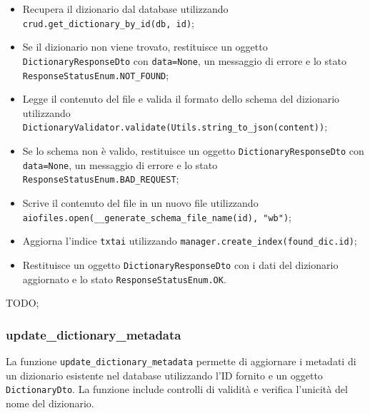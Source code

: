 \begin{itemize}
 \item Recupera il dizionario dal database utilizzando \texttt{crud.get\_dictionary\_by\_id(db, id)};
 \item Se il dizionario non viene trovato, restituisce un oggetto \texttt{DictionaryResponseDto} con \texttt{data=None}, un messaggio di errore e lo stato \texttt{ResponseStatusEnum.NOT\_FOUND};
 \item Legge il contenuto del file e valida il formato dello schema del dizionario utilizzando \texttt{DictionaryValidator.validate(Utils.string\_to\_json(content))};
 \item Se lo schema non è valido, restituisce un oggetto \texttt{DictionaryResponseDto} con \texttt{data=None}, un messaggio di errore e lo stato \texttt{ResponseStatusEnum.BAD\_REQUEST};
 \item Scrive il contenuto del file in un nuovo file utilizzando \texttt{aiofiles.open(\_\_generate\_schema\_file\_name(id), "wb")};
 \item Aggiorna l'indice \texttt{txtai} utilizzando \texttt{manager.create\_index(found\_dic.id)};
 \item Restituisce un oggetto \texttt{DictionaryResponseDto} con i dati del dizionario aggiornato e lo stato \texttt{ResponseStatusEnum.OK}.
\end{itemize}

\par TODO;

\subsubsection{update\_dictionary\_metadata}

\par La funzione \texttt{update\_dictionary\_metadata} permette di aggiornare i metadati di un dizionario esistente nel database utilizzando l'ID fornito e un oggetto \texttt{DictionaryDto}. La funzione include controlli di validità e verifica l'unicità del nome del dizionario.

